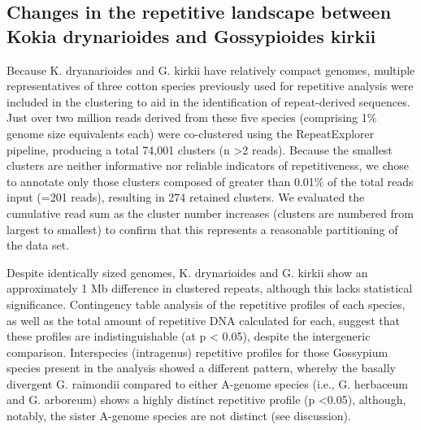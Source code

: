 \documentclass[10pt,letterpaper]{article}
\newcommand{\note}[2][]{\added[id=#1,remark={#2}]{}}
\begin{document}
\subsection*{Changes in the repetitive landscape between Kokia drynarioides and
  Gossypioides kirkii}

Because K. dryanarioides and G. kirkii have relatively compact genomes, multiple
representatives of three cotton species previously used for repetitive analysis
\cite{Renny-Byfield2016} were included in the clustering to aid in the
identification of repeat-derived sequences. Just over two million reads derived
from these five species (comprising 1\% genome size equivalents each) were
co-clustered using the RepeatExplorer pipeline, producing a total 74,001
clusters (n >2 reads). Because the smallest clusters are neither informative nor
reliable indicators of repetitiveness, we chose to annotate only those clusters
composed of greater than 0.01\% of the total reads input (=201 reads), resulting
in 274 retained clusters. We evaluated the cumulative read sum as the cluster
number increases (clusters are numbered from largest to smallest) to confirm
that this represents a reasonable partitioning of the data set.
\note{cotton\_cutoff.png}

Despite identically sized genomes, K. drynarioides and G. kirkii show an
approximately 1 Mb\note[Corrinne]{put the linear regression stuff in here?}
difference in clustered repeats, although this lacks statistical significance.
Contingency table analysis of the repetitive profiles of each species, as well
as the total amount of repetitive DNA calculated for each, suggest that these
profiles are indistinguishable (at p < 0.05), despite the intergeneric
comparison. Interspecies (intragenus) repetitive profiles for those Gossypium
species present in the analysis showed a different pattern, whereby the basally
divergent G. raimondii compared to either A-genome species (i.e., G. herbaceum
and G. arboreum) shows a highly distinct repetitive profile (p <0.05), although,
notably, the sister A-genome species are not distinct (see discussion).
\end{document}
